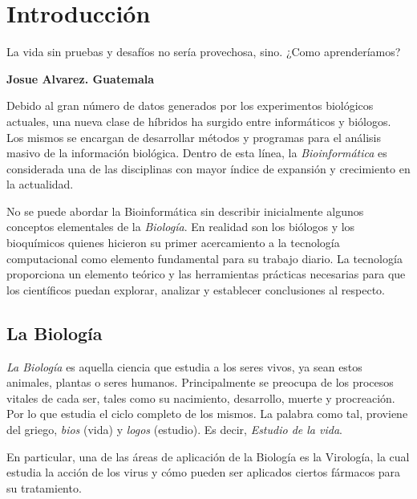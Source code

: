 \chapter*{Introducción}
\label{intro}

\epigraph{La vida sin pruebas y desafíos no sería provechosa, sino. ¿Como aprenderíamos?}%
{\textbf{Josue Alvarez. Guatemala }}

\par Debido al gran número de datos generados por los experimentos biológicos actuales, una nueva clase de híbridos ha surgido entre informáticos y biólogos. Los mismos se encargan de desarrollar métodos y programas para el análisis masivo de la información biológica. Dentro de esta línea, la \emph{Bioinformática} es considerada una de las disciplinas con mayor índice de expansión y crecimiento en la actualidad. 

\par No se puede abordar la Bioinformática sin describir inicialmente algunos conceptos elementales de la \emph{Biología}. En realidad son los biólogos y los bioquímicos quienes hicieron su primer acercamiento a la tecnología computacional como elemento fundamental para su trabajo diario. La tecnología proporciona un elemento teórico y las herramientas prácticas necesarias para que los científicos puedan explorar, analizar y establecer conclusiones al respecto.

\section*{La Biología}

\par \emph{La Biología} es aquella ciencia que estudia a los seres vivos, ya sean estos animales, plantas o seres humanos. Principalmente se preocupa de los procesos vitales de cada ser, tales como su nacimiento, desarrollo, muerte y procreación. Por lo que estudia el ciclo completo de los mismos\cite{curtis}. La palabra como tal, proviene del griego, \emph{bios} (vida) y \emph{logos} (estudio). Es decir, \emph{Estudio de la vida}.

\par En particular, una de las áreas de aplicación de la Biología es la Virología, la cual estudia la acción de los virus y cómo pueden ser aplicados ciertos fármacos para su tratamiento.

